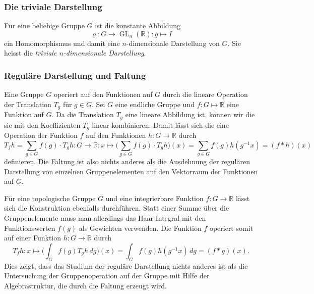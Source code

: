 %
%
\subsubsection{Die triviale Darstellung}
Für eine beliebige Gruppe $G$ ist die konstante Abbildung
\[
\varrho
\colon
G\to \operatorname{GL}_n(\mathbb{R})
:
g\mapsto I
\]
ein Homomorphismus und damit eine $n$-dimensionale Darstellung von $G$.
Sie heisst die {\em triviale $n$-dimensionale Darstellung}.

%
%
\subsubsection{Reguläre Darstellung und Faltung}
Eine Gruppe $G$ operiert auf den Funktionen auf $G$ durch die 
lineare Operation der Translation $T_g$ für $g\in G$.
Sei $G$ eine endliche Gruppe und $f\colon G\mapsto \mathbb{R}$ eine
Funktion auf $G$.
Da die Translation $T_g$ eine lineare Abbildung ist, können wir die 
sie mit den Koeffizienten $T_g$ linear kombinieren.
Damit lässt sich die eine Operation der Funktion $f$ auf den Funktionen
$h\colon G\to\mathbb{R}$ durch
\begin{equation}
T_fh
=
\sum_{g\in G} f(g)\cdot T_gh
\colon
G\to\mathbb{R}
:
x\mapsto
\biggl( \sum_{g\in G} f(g)\cdot T_gh\biggr) (x)
=
\sum_{g\in G} f(g)h(g^{-1}x)
=
(f*h)(x)
\end{equation}
definieren.
Die Faltung ist also nichts anderes als die Ausdehnung der regulären
Darstellung von einzelnen Gruppenelementen auf den Vektorraum
der Funktionen auf $G$.

Für eine topologische Gruppe $G$ und eine integrierbare Funktion
$f\colon G\to\mathbb{R}$
lässt sich die Konstruktion ebenfalls durchführen.
Statt einer Summe über die Gruppenelemente muss man allerdings das
Haar-Integral mit den Funktionswerten $f(g)$ als Gewichten verwenden.
Die Funktion $f$ operiert somit auf einer Funktion $h\colon G\to\mathbb{R}$
durch 
\[
T_fh\colon
x\mapsto
\biggl(\int_G f(g) T_gh\,dg\biggr)(x)
=
\int_G f(g) h(g^{-1}x)\,dg
=
(f*g)(x).
\]
Dies zeigt, dass das Studium der reguläre Darstellung nichts anderes
ist als die Untersuchung der Gruppenoperation auf der Gruppe mit Hilfe
der Algebrastruktur, die durch die Faltung erzeugt wird.

